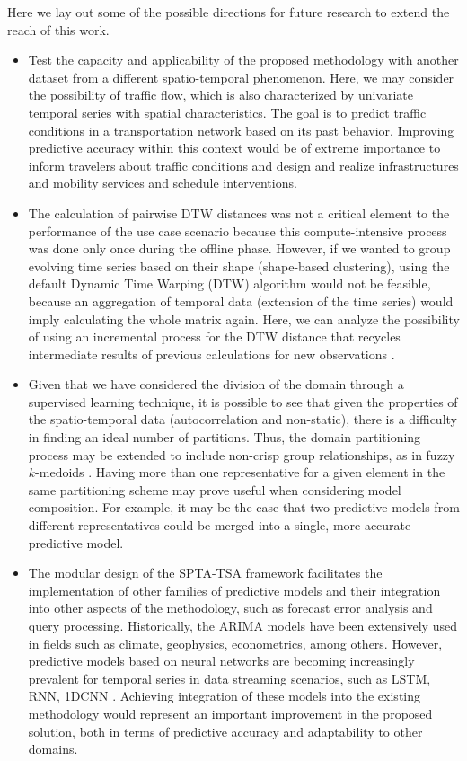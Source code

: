 Here we lay out some of the possible directions for future research to extend the reach of this work.

\begin{itemize}
    
    \item Test the capacity and applicability of the proposed methodology with another dataset from a different spatio-temporal phenomenon. Here, we may consider the possibility of traffic flow, which is also characterized by univariate temporal series with spatial characteristics. The goal is to predict traffic conditions in a transportation network based on its past behavior. Improving predictive accuracy within this context would be of extreme importance to inform travelers about traffic conditions and design and realize infrastructures and mobility services and schedule interventions.
    
    \item The calculation of pairwise DTW distances was not a critical element to the performance of the use case scenario because this compute-intensive process was done only once during the offline phase. However, if we wanted to group evolving time series based on their shape (shape-based clustering), using the default Dynamic Time Warping (DTW) algorithm would not be feasible, because an aggregation of temporal data (extension of the time series) would imply calculating the whole matrix again. Here, we can analyze the possibility of using an incremental process for the DTW distance that recycles intermediate results of previous calculations for new observations \cite{Oregi2017}.
    
    \item Given that we have considered the division of the domain through a supervised learning technique, it is possible to see that given the properties of the spatio-temporal data (autocorrelation and non-static), there is a difficulty in finding an ideal number of partitions. Thus, the domain partitioning process may be extended to include non-crisp group relationships, as in fuzzy $k$-medoids \cite{Izakian2015}. Having more than one representative for a given element in the same partitioning scheme may prove useful when considering model composition. For example, it may be the case that two predictive models from different representatives could be merged into a single, more accurate predictive model.

    \item The modular design of the SPTA-TSA framework facilitates the implementation of other families of predictive models and their integration into other aspects of the methodology, such as forecast error analysis and query processing. Historically, the ARIMA models have been extensively used in fields such as climate, geophysics, econometrics, among others. However, predictive models based on neural networks are becoming increasingly prevalent for temporal series in data streaming scenarios, such as LSTM, RNN, 1DCNN \cite{Shen2020, Torres2021}. Achieving integration of these models into the existing methodology would represent an important improvement in the proposed solution, both in terms of predictive accuracy and adaptability to other domains.


\end{itemize}
